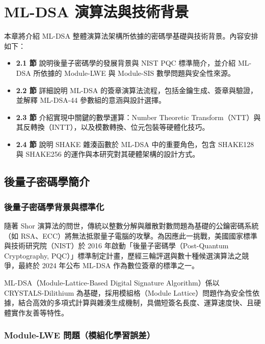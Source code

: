 \documentclass[12pt, a4paper, fleqn]{./styles/ntust_report}
\begin{document}
\baselineskip=24pt  %
\setcounter{chapter}{1} \fi

\chapter{ML-DSA 演算法與技術背景}

本章將介紹 ML-DSA 整體演算法架構所依據的密碼學基礎與技術背景。內容安排如下：

\begin{itemize}
    \item \textbf{2.1 節} 說明後量子密碼學的發展背景與 NIST PQC 標準簡介，並介紹 ML-DSA 所依據的 Module-LWE 與 Module-SIS 數學問題與安全性來源。
    \item \textbf{2.2 節} 詳細說明 ML-DSA 的簽章演算法流程，包括金鑰生成、簽章與驗證，並解釋 ML-DSA-44 參數組的意涵與設計選擇。
    \item \textbf{2.3 節} 介紹實現中關鍵的數學運算：Number Theoretic Transform（NTT）與其反轉換（INTT），以及模數轉換、位元包裝等硬體化技巧。
    \item \textbf{2.4 節} 說明 SHAKE 雜湊函數於 ML-DSA 中的重要角色，包含 SHAKE128 與 SHAKE256 的運作與本研究對其硬體架構的設計方式。
\end{itemize}

\section{後量子密碼學簡介}
\subsection{後量子密碼學背景與標準化}

隨著 Shor 演算法的問世，傳統以整數分解與離散對數問題為基礎的公鑰密碼系統（如 RSA、ECC）將無法抵禦量子電腦的攻擊。為因應此一挑戰，美國國家標準與技術研究院（NIST）於 2016 年啟動「後量子密碼學（Post-Quantum Cryptography, PQC）」標準制定計畫，歷經三輪評選與數十種候選演算法之競爭，最終於 2024 年公布 ML-DSA 作為數位簽章的標準之一。

ML-DSA（Module-Lattice-Based Digital Signature Algorithm）係以 CRYSTALS-Dilithium 為基礎，採用模組格（Module Lattice）問題作為安全性依據，結合高效的多項式計算與雜湊生成機制，具備短簽名長度、運算速度快、且硬體實作友善等特性。



\subsection{Module-LWE 問題（模組化學習誤差）}
\end{document}
